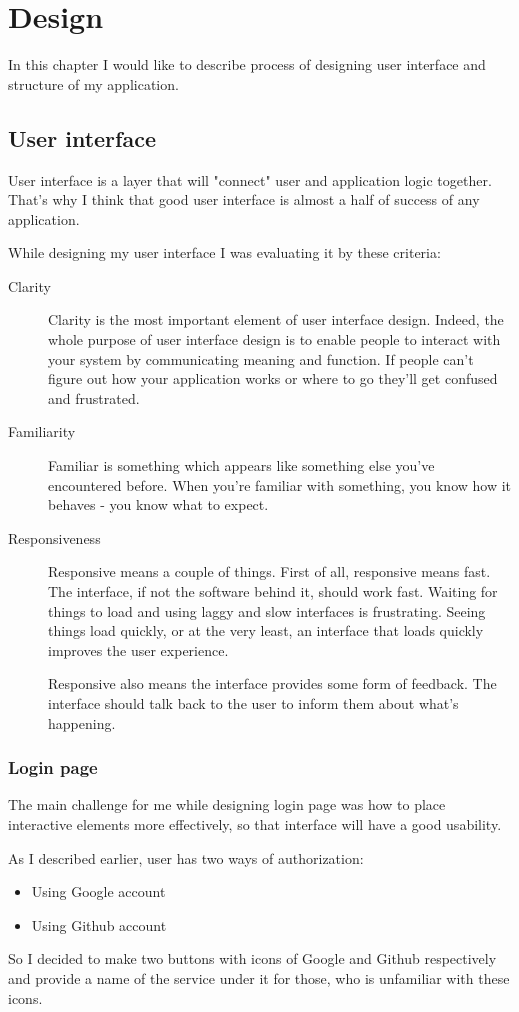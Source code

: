 \documentclass[thesis=B,english]{FITthesis}[2012/10/20]
\begin{document}
\chapter{Design}
In this chapter I would like to describe process of designing user interface and structure of my application.
\section{User interface}
User interface is a layer that will "connect" user and application logic together. That's why I think that good user interface is almost a half of success of any application. 

While designing my user interface I was evaluating it by these criteria:
	\begin{description}
		\item [Clarity] Clarity is the most important element of user interface design. Indeed, the whole purpose of user interface design is to enable people to interact with your system by communicating meaning and function. If people can’t figure out how your application works or where to go they’ll get confused and frustrated. \cite{ui}
		\item [Familiarity] Familiar is something which appears like something else you’ve encountered before. When you’re familiar with something, you know how it behaves - you know what to expect.
		\item [Responsiveness] Responsive means a couple of things. First of all, responsive means fast. The interface, if not the software behind it, should work fast. Waiting for things to load and using laggy and slow interfaces is frustrating. Seeing things load quickly, or at the very least, an interface that loads quickly improves the user experience.

Responsive also means the interface provides some form of feedback. The interface should talk back to the user to inform them about what’s happening. \cite{ui}
	\end{description}
\subsection{Login page}
The main challenge for me while designing login page was how to place interactive elements more effectively, so that interface will have a good usability.

As I described earlier, user has two ways of authorization: 
	\begin{itemize}
		\item Using Google account
		\item Using Github account
	\end{itemize}
So I decided to make two buttons with icons of Google and Github respectively and provide a name of the service under it for those, who is unfamiliar with these icons.
\end{document}
